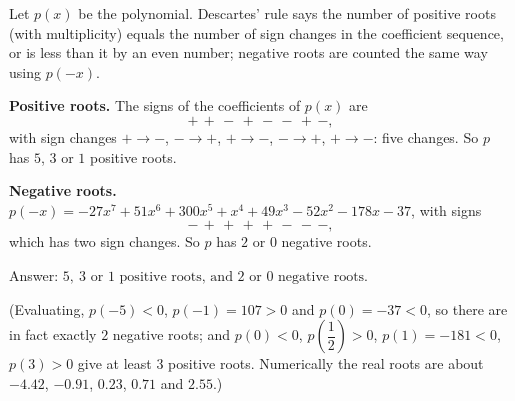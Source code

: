 Let $p(x)$ be the polynomial. Descartes' rule says the number of positive roots (with multiplicity) equals the number of sign changes in the coefficient sequence, or is less than it by an even number; negative roots are counted the same way using $p(-x)$.

\textbf{Positive roots.} The signs of the coefficients of $p(x)$ are
\[
+\,+\,-\,+\,-\,-\,+\,- ,
\]
with sign changes $+\to-$, $-\to+$, $+\to-$, $-\to+$, $+\to-$: five changes. So $p$ has $5$, $3$ or $1$ positive roots.

\textbf{Negative roots.} $p(-x)=-27x^7+51x^6+300x^5+x^4+49x^3-52x^2-178x-37$, with signs
\[
-\,+\,+\,+\,+\,-\,-\,- ,
\]
which has two sign changes. So $p$ has $2$ or $0$ negative roots.

Answer: $\boxed{5,\ 3\text{ or }1\text{ positive roots, and }2\text{ or }0\text{ negative roots}}$.

(Evaluating, $p(-5)<0$, $p(-1)=107>0$ and $p(0)=-37<0$, so there are in fact exactly $2$ negative roots; and $p(0)<0$, $p\!\left(\dfrac{1}{2}\right)>0$, $p(1)=-181<0$, $p(3)>0$ give at least $3$ positive roots. Numerically the real roots are about $-4.42$, $-0.91$, $0.23$, $0.71$ and $2.55$.)
